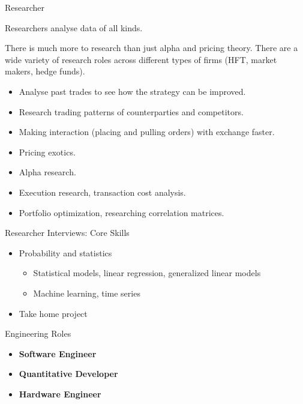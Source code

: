 \begin{frame}{Researcher}
  \begin{sqt:definition}
    Researchers analyse data of all kinds.
  \end{sqt:definition}

  There is much more to research than just alpha and pricing theory.
  There are a wide variety of research roles across different types of firms (HFT, market makers, hedge funds).

  \begin{itemize}
    \item Analyse past trades to see how the strategy can be improved.
    \item Research trading patterns of counterparties and competitors.
    \item Making interaction (placing and pulling orders) with exchange faster.
    \item Pricing exotics.
    \item Alpha research.
    \item Execution research, transaction cost analysis.
    \item Portfolio optimization, researching correlation matrices.
  \end{itemize}
\end{frame}

\begin{frame}{Researcher Interviews: Core Skills}
  \begin{itemize}
    \item Probability and statistics
    \begin{itemize}
      \item Statistical models, linear regression, generalized linear models
      \item Machine learning, time series
    \end{itemize}
    \item Take home project
  \end{itemize}
\end{frame}

\begin{frame}{Engineering Roles}

  \begin{itemize}
    \item \textbf{Software Engineer}
    \item \textbf{Quantitative Developer}
    \item \textbf{Hardware Engineer}
  \end{itemize}
\end{frame}

